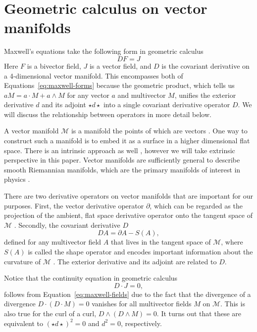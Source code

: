 \documentclass[twocolumn,notitlepage,nofootinbib,tightenlines]{revtex4-1}
\theoremstyle{definition}
\theoremstyle{remark}
\numberwithin{equation}{section}
\begin{document}
\section{Geometric calculus on vector manifolds}

Maxwell's equations take the following form in geometric calculus
%
\begin{equation}\label{eq:maxwell-fields}
    D F = J
\end{equation}
%
Here $F$ is a bivector field, $J$ is a vector field, and $D$ is the covariant derivative on a 4-dimensional vector manifold. This encompasses both of Equations~\ref{eq:maxwell-forms} because the geometric product, which tells us $aM = a \cdot M + a \wedge M$ for any vector $a$ and multivector $M$, unifies the exterior derivative $d$ and its adjoint $\star d \star$ into a single covariant derivative operator $D$. We will discuss the relationship between operators in more detail below.

A vector manifold $\mathcal{M}$ is a manifold the points of which are vectors \cite{hestenes, doran}. One way to construct such a manifold is to embed it as a surface in a higher dimensional flat space. There is an intrinsic approach as well \cite{hestenes-shape}, however we will take extrinsic perspective in this paper. Vector manifolds are sufficiently general to describe smooth Riemannian manifolds, which are the primary manifolds of interest in physics \cite{doran}.

There are two derivative operators on vector manifolds that are important for our purposes. First, the vector derivative operator $\partial$, which can be regarded as the projection of the ambient, flat space derivative operator onto the tangent space of $\mathcal{M}$ \cite{macdonald, hestenes, doran}. Secondly, the covariant derivative $D$
%
\begin{equation}\label{eq:vector-covariant}
  D A = \partial A - S(A),
\end{equation}
%
defined for any multivector field $A$ that lives in the tangent space of $\mathcal{M}$, where $S(A)$ is called the shape operator and encodes important information about the curvature of $\mathcal{M}$ \cite{hestenes, doran}. The exterior derivative and its adjoint are related to $D$.

Notice that the continuity equation in geometric calculus
%
\begin{equation}\label{eq:continuity-fields}
    D \cdot J = 0,
\end{equation}
%
follows from Equation~\ref{eq:maxwell-fields} due to the fact that the divergence of a divergence $D \cdot (D \cdot M) = 0$ vanishes for all multivector fields $M$ on $\mathcal{M}$. This is also true for the curl of a curl, $D \wedge (D \wedge M) = 0$. It turns out that these are equivalent to $(\star d \star)^2 = 0$ and $d^2 = 0$, respectively.
\end{document}
